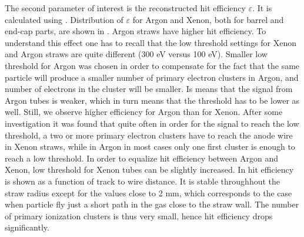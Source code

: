 
The second parameter of interest is the reconstructed hit efficiency $\varepsilon$. It is calculated using .
Distribution of $\varepsilon$ for Argon and Xenon, both for barrel and end-cap parts, are shown in .
Argon straws have higher hit efficiency. To understand this effect one has to recall that the low threshold settings
for Xenon and Argon straws are quite different (300 eV versus 100 eV). Smaller low threshold for Argon was chosen 
in order to compensate for the fact that the same particle will produce a smaller number of primary electron clusters in Argon, 
and number of electrons in the cluster will be smaller. Is means that the signal from Argon tubes is weaker, which in turn means
that the threshold has to be lower as well. Still, we observe higher efficiency for Argon than for Xenon. After some investigation
it was found that quite often in order for the signal to reach the low threshold, a two or more primary electron clusters have to reach the anode wire in
Xenon straws, while in Argon in most cases only one first cluster is enough to reach a low threshold.
In order to equalize hit efficiency between Argon and Xenon, low threshold for Xenon tubes can be slightly increased.
In  hit efficiency is shown as a function of track to wire distance. 
It is stable throughhout the straw radius except for the values close to 2 mm, which corresponds
to the case when particle fly just a short path in the gas close to the straw wall. 
The number of primary ionization clusters is thus very small, hence hit efficiency drops significantly.

